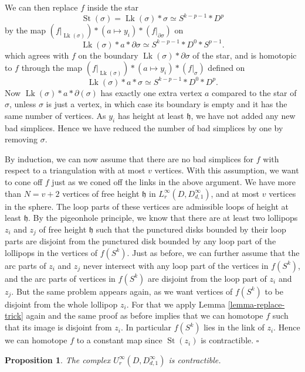 \documentclass[11pt, a4paper]{amsart}
\newtheorem{prop}[thm]{Proposition}
\theoremstyle{definition}
\DeclareMathOperator{\Lk}{Lk}
\DeclareMathOperator{\St}{St}
\def\qed{\hfill$\square$\smallskip}
\begin{document}
We can then replace $f$ inside the star
\[
\St(\sigma)=\Lk(\sigma)*\sigma \simeq S^{k-p-1}*D^p
\]
by the map $(f|_{\Lk(\sigma)})*(a\mapsto y_i)*(f|_{\partial \sigma})$ on 
\[
\Lk(\sigma)*a*\partial\sigma \simeq S^{k-p-1}*D^0*S^{p-1}.
\]
which agrees with $f$ on the boundary $\Lk(\sigma)*\partial\sigma$ of the star, and is homotopic to $f$ 
through the map $(f|_{\Lk(\sigma)})*(a\mapsto y_i)*(f|_{\sigma})$ defined on 
\[
\Lk(\sigma)*a*\sigma\simeq S^{k-p-1}*D^0*D^p.
\] 
Now $\Lk(\sigma)*a*\partial(\sigma)$  has exactly one extra vertex $a$ compared to the star of $\sigma$, unless $\sigma$ is just a vertex, in which case its boundary is empty and it has the same number of vertices.
As $y_i$ has height at least $\mathfrak{h}$, we have not added any new bad simplices. Hence we have reduced the number of bad simplices by one by removing $\sigma$. 

By induction, we can now assume that there are no bad simplices for $f$ with respect to a triangulation with at most $v$ vertices. With this assumption, we want to 
cone off $f$ just as we coned off the links in the above argument.  We have more than $N=v+2$ vertices of free height $\mathfrak{h}$ in $L_r^{\infty}(D,D^{\infty}_{d,1})$, and at most $v$ vertices in the sphere. The loop parts of these vertices are admissible loops of  height at least $\mathfrak{h}$. By the pigeonhole principle, we know that there are at least two lollipops $z_i$ and $z_j$ of free height $\mathfrak{h}$ such that the punctured disks bounded by their loop parts are disjoint from the punctured disk bounded by any loop part  of the lollipops in the vertices of $f(S^k)$. Just as before, we can further assume that the arc parts of $z_i$ and $z_j$ never intersect with any loop part of the vertices in $f(S^k)$, and the arc parts of  vertices in $f(S^k)$ are disjoint from the loop part of $z_i$ and $z_j$. But the same problem appears again, as we want vertices of $f(S^k)$ to be disjoint from the whole lollipop $z_i$. For that we apply  Lemma \ref{lemma-replace-trick} again and the same proof as before implies that we can homotope $f$ such that its image is disjoint from $z_i$. In particular $f(S^k)$ lies in the link of $z_i$. Hence we can homotope $f$ to a constant map since $\St(z_i)$ is contractible.
\qed




\begin{prop}\label{prop-Un-inf}
The complex $U_r^{\infty}(D,D^{\infty}_{d,1})$ is contractible.
\end{prop}
\end{document}
